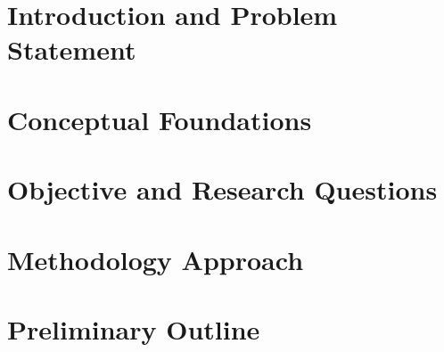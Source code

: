 %
\section{Introduction and Problem Statement}
\label{sec:introduction-and-problem-statement}
%

%
\newpage
%
\section{Conceptual Foundations}
\label{sec:conceptual-foundations}

%
\newpage
%
\section{Objective and Research Questions}
\label{sec:objective-and-research-questions}
%

%
\newpage
%
\section{Methodology Approach}
\label{sec:methodology-approach}
%

%
\newpage
%
\section{Preliminary Outline}
\label{sec:preliminary-outline}
%

